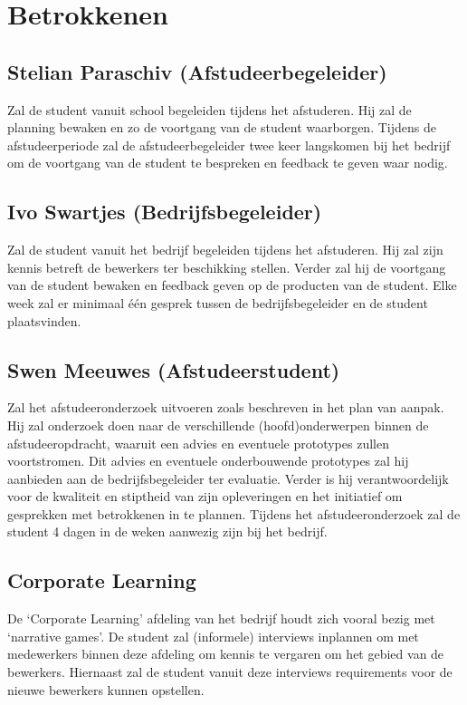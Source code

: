 \chapter{Betrokkenen}
\section{Stelian Paraschiv (Afstudeerbegeleider)}
Zal de student vanuit school begeleiden tijdens het afstuderen. Hij zal de planning bewaken en zo de voortgang van de student waarborgen. Tijdens de afstudeerperiode zal de afstudeerbegeleider twee keer langskomen bij het bedrijf om de voortgang van de student te bespreken en feedback te geven waar nodig.

\section{Ivo Swartjes (Bedrijfsbegeleider)}
Zal de student vanuit het bedrijf begeleiden tijdens het afstuderen. Hij zal zijn kennis betreft de bewerkers ter beschikking stellen. Verder zal hij de voortgang van de student bewaken en feedback geven op de producten van de student. Elke week zal er minimaal één gesprek tussen de bedrijfsbegeleider en de student plaatsvinden.

\section{Swen Meeuwes (Afstudeerstudent)}
Zal het afstudeeronderzoek uitvoeren zoals beschreven in het plan van aanpak. Hij zal onderzoek doen naar de verschillende (hoofd)onderwerpen binnen de afstudeeropdracht, waaruit een advies en eventuele prototypes zullen voortstromen. Dit advies en eventuele onderbouwende prototypes zal hij aanbieden aan de bedrijfsbegeleider ter evaluatie. Verder is hij verantwoordelijk voor de kwaliteit en stiptheid van zijn opleveringen en het initiatief om gesprekken met betrokkenen in te plannen. Tijdens het afstudeeronderzoek zal de student 4 dagen in de weken aanwezig zijn bij het bedrijf.

\section{Corporate Learning}
De ‘Corporate Learning’ afdeling van het bedrijf houdt zich vooral bezig met ‘narrative games’. De student zal (informele) interviews inplannen om met medewerkers binnen deze afdeling om kennis te vergaren om het gebied van de bewerkers. Hiernaast zal de student vanuit deze interviews requirements voor de nieuwe bewerkers kunnen opstellen.